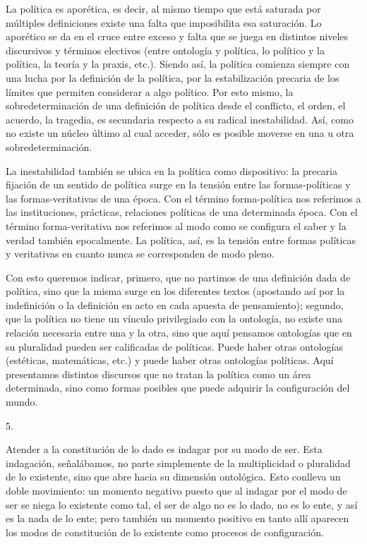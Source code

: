 La política es aporética, es decir, al mismo tiempo que está saturada por múltiples definiciones existe una falta que imposibilita esa saturación. Lo aporético se da en el cruce entre exceso y falta que se juega en distintos niveles discursivos y términos electivos (entre ontología y política, lo político y la política, la teoría y la praxis, etc.). Siendo así, la política comienza siempre con una lucha por la definición de la política, por la estabilización precaria de los límites que permiten considerar a algo político. Por esto mismo, la sobredeterminación de una definición de política desde el conflicto, el orden, el acuerdo, la tragedia, es secundaria respecto a su radical inestabilidad. Así, como no existe un núcleo último al cual acceder, sólo es posible moverse en una u otra sobredeterminación.

La inestabilidad también se ubica en la política como dispositivo: la precaria fijación de un sentido de política surge en la tensión entre las formas-políticas y las formas-veritativas de una época. Con el término forma-política nos referimos a las instituciones, prácticas, relaciones políticas de una determinada época. Con el término forma-veritativa nos referimos al modo como se configura el saber y la verdad también epocalmente. La política, así, es la tensión entre formas políticas y veritativas en cuanto nunca se corresponden de modo pleno.

Con esto queremos indicar, primero, que no partimos de una definición dada de política, sino que la misma surge en los diferentes textos (apostando así por la indefinición o la definición en acto en cada apuesta de pensamiento); segundo, que la política no tiene un vínculo privilegiado con la ontología, no existe una relación necesaria entre una y la otra, sino que aquí pensamos ontologías que en su pluralidad pueden ser calificadas de políticas. Puede haber otras ontologías (estéticas, matemáticas, etc.) y puede haber otras ontologías políticas. Aquí presentamos distintos discursos que no tratan la política como un área determinada, sino como formas posibles que puede adquirir la configuración del mundo.

5.

Atender a la constitución de lo dado es indagar por su modo de ser. Esta indagación, señalábamos, no parte simplemente de la multiplicidad o pluralidad de lo existente, sino que abre hacia su dimensión ontológica. Esto conlleva un doble movimiento: un momento negativo puesto que al indagar por el modo de ser se niega lo existente como tal, el ser de algo no es lo dado, no es lo ente, y así es la nada de lo ente; pero también un momento positivo en tanto allí aparecen los modos de constitución de lo existente como procesos de configuración.

